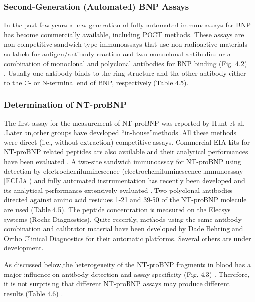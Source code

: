 \documentclass[14pt,a4paper,onecolumn]{extarticle}
\begin{document}
\subsubsection{ Second-Generation (Automated) BNP Assays}

In the past few years a new generation of fully automated immunoassays for BNP has
become commercially available, including POCT methods. These assays are non-competitive sandwich-type immunoassays that use non-radioactive materials as labels for
antigen/antibody reaction and two monoclonal antibodies or a combination of monoclonal and polyclonal antibodies for BNP binding (Fig. 4.2) \citep{bib27} \citep{bib28} \citep{bib215} \citep{bib258} \citep{bib259} \citep{bib260} \citep{bib261} \citep{bib262} \citep{bib263} \citep{bib264}. Usually one
antibody binds to the ring structure and the other antibody either to the C- or N-terminal end of BNP, respectively (Table 4.5).

\subsubsection{ Determination of NT-proBNP}

The first assay for the measurement of NT-proBNP was reported by Hunt et al.\citep{bib265} \citep{bib266}.Later
on,other groups have developed “in-house”methods \citep{bib267} \citep{bib268}.All these methods were direct
(i.e., without extraction) competitive assays. Commercial EIA kits for NT-proBNP related
peptides are also available and their analytical performances have been evaluated \citep{bib25} \citep{bib211} \citep{bib269}.
A two-site sandwich immunoassay for NT-proBNP using detection by electrochemiluminescence (electrochemiluminescence immunoassay [ECLIA]) and fully automated instrumentation has recently been developed and its analytical performance
extensively evaluated \citep{bib269} \citep{bib270} \citep{bib271} \citep{bib272} \citep{bib273} \citep{bib274} \citep{bib275}. Two polyclonal antibodies directed against amino acid
residues 1-21 and 39-50 of the NT-proBNP molecule are used (Table 4.5). The peptide
concentration is measured on the Elecsys systems (Roche Diagnostics). Quite recently,
methods using the same antibody combination and calibrator material have been developed by Dade Behring and Ortho Clinical Diagnostics for their automatic platforms. Several others are under development.

As discussed below,the heterogeneity of the NT-proBNP fragments in blood has a major
influence on antibody detection and assay specificity (Fig. 4.3) \citep{bib21} \citep{bib24} \citep{bib276}. Therefore, it is not
surprising that different NT-proBNP assays may produce different results (Table 4.6) \citep{bib23}.
\end{document}
